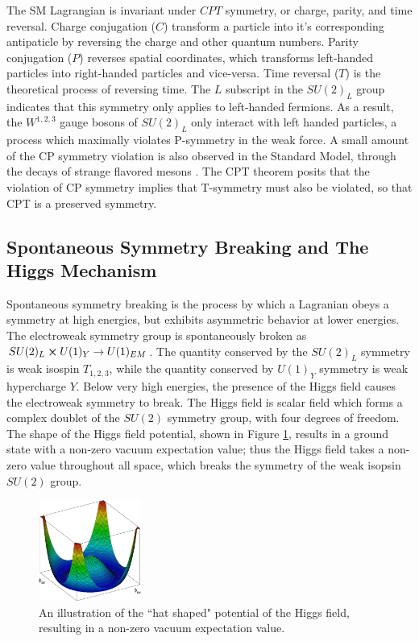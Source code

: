 The SM Lagrangian is invariant under $CPT$ symmetry, or charge, parity, and time reversal. Charge conjugation ($C$) transform a particle into it's corresponding antipaticle by reversing the charge and other quantum numbers. Parity conjugation ($P$) reverses spatial coordinates, which transforms left-handed particles into right-handed particles and vice-versa. Time reversal ($T$) is the theoretical process of reversing time. The $L$ subscript in the $SU(2)_L$ group indicates that this symmetry only applies to left-handed fermions. As a result, the $W^{1,2,3}$ gauge bosons of $SU(2)_L$ only interact with left handed particles, a process which maximally violates P-symmetry in the weak force. A small amount of the CP symmetry violation is also observed in the Standard Model, through the decays of strange flavored mesons \cite{strange_mesons}. The CPT theorem posits that the violation of CP symmetry implies that T-symmetry must also be violated, so that CPT is a preserved symmetry.\par

\subsection{Spontaneous Symmetry Breaking and The Higgs Mechanism}
\label{sec:sponsymbrk}

Spontaneous symmetry breaking is the process by which a Lagranian obeys a symmetry at high energies, but exhibits asymmetric behavior at lower energies. The electroweak symmetry group is spontaneously broken as $SU(2)_L \cross U(1)_Y \rightarrow U(1)_{EM}$. The quantity conserved by the $SU(2)_L$ symmetry is weak isospin $T_{1,2,3}$, while the quantity conserved by $U(1)_Y$ symmetry is weak hypercharge $Y$. Below very high energies, the presence of the Higgs field causes the electroweak symmetry to break. The Higgs field is scalar field which forms a complex doublet of the $SU(2)$ symmetry group, with four degrees of freedom. The shape of the Higgs field potential, shown in Figure \ref{fig:higgs_field}, results in a ground state with a non-zero vacuum expectation value; thus the Higgs field takes a non-zero value throughout all space, which breaks the symmetry of the weak isopsin $SU(2)$ group. \par

\begin{figure}
	\centering
	\includegraphics[width=0.3\textwidth]{figures/ch1/higgs_field.png}
	\caption{An illustration of the ``hat shaped" potential of the Higgs field, resulting in a non-zero vacuum expectation value. }
	\label{fig:higgs_field}
\end{figure}

